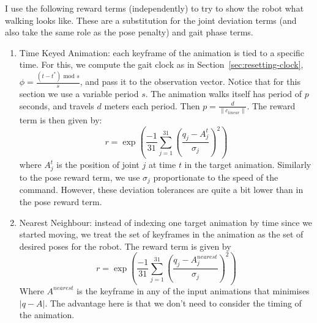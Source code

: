 \documentclass[11pt]{article}
\begin{document}
I use the following reward terms (independently) to try to show the robot what walking looks like. These are a substitution for the joint deviation terms (and also take the same role as the pose penalty) and gait phase terms.
\begin{enumerate}
    \item Time Keyed Animation: each keyframe of the animation is tied to a specific time. For this, we compute the gait clock as in Section~\ref{sec:resetting-clock}, $\phi =\frac {(t-t^*) \text{ mod } s}{s}$, and pass it to the observation vector. Notice that for this section we use a variable period $s$. The animation walks itself has period of $p$ seconds, and travels $d$ meters each period. Then $p=\frac{d}{\|c_{linear}\|}$. The reward term is then given by:
    \[
        r=\exp (\frac{-1}{31} \sum_{j=1}^{31}(\frac{q_j-A_j^t}{\sigma_j})^2)
    \]
    where $A_j^t$ is the position of joint $j$ at time $t$ in the target animation. Similarly to the pose reward term, we use $\sigma_j$ proportionate to the speed of the command. However, these deviation tolerances are quite a bit lower than in the pose reward term.
    \item Nearest Neighbour: instead of indexing one target animation by time since we started moving, we treat the set of keyframes in the animation as the set of desired poses for the robot. The reward term is given by
    \[
        r=\exp (\frac{-1}{31} \sum_{j=1}^{31}(\frac{q_j-A_j^{nearest}}{\sigma_j})^2)
    \]
    Where $A^{nearest}$ is the keyframe in any of the input animations that minimises $|q-A|$. The advantage here is that we don't need to consider the timing of the animation.
\end{enumerate}
\end{document}

